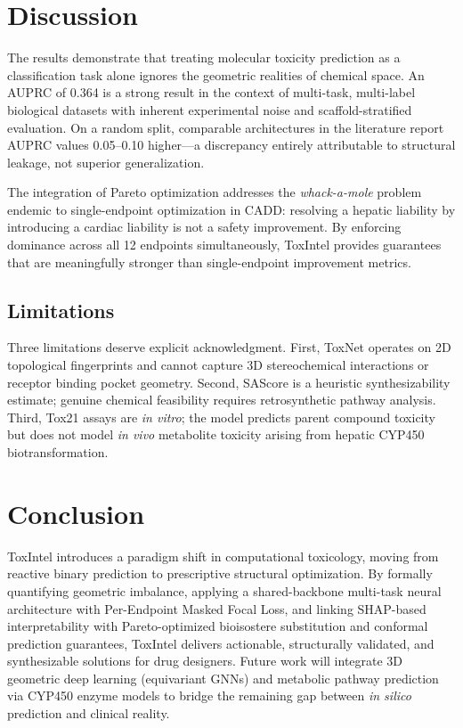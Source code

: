 \documentclass[lettersize,journal]{IEEEtran}
\begin{document}
\section{Discussion}
The results demonstrate that treating molecular toxicity prediction as a
classification task alone ignores the geometric realities of chemical space.
An AUPRC of 0.364 is a strong result in the context of multi-task,
multi-label biological datasets with inherent experimental noise and
scaffold-stratified evaluation.
On a random split, comparable architectures in the literature report AUPRC
values 0.05--0.10 higher---a discrepancy entirely attributable to structural
leakage, not superior generalization.

The integration of Pareto optimization addresses the \textit{whack-a-mole}
problem endemic to single-endpoint optimization in CADD: resolving a hepatic
liability by introducing a cardiac liability is not a safety improvement.
By enforcing dominance across all 12 endpoints simultaneously, ToxIntel
provides guarantees that are meaningfully stronger than single-endpoint
improvement metrics.

\subsection{Limitations}
Three limitations deserve explicit acknowledgment.
First, ToxNet operates on 2D topological fingerprints and cannot capture
3D stereochemical interactions or receptor binding pocket geometry.
Second, SAScore is a heuristic synthesizability estimate; genuine chemical
feasibility requires retrosynthetic pathway analysis.
Third, Tox21 assays are \textit{in vitro}; the model predicts parent
compound toxicity but does not model \textit{in vivo} metabolite toxicity
arising from hepatic CYP450 biotransformation.

\section{Conclusion}
ToxIntel introduces a paradigm shift in computational toxicology, moving
from reactive binary prediction to prescriptive structural optimization.
By formally quantifying geometric imbalance, applying a shared-backbone
multi-task neural architecture with Per-Endpoint Masked Focal Loss, and
linking SHAP-based interpretability with Pareto-optimized bioisostere
substitution and conformal prediction guarantees, ToxIntel delivers
actionable, structurally validated, and synthesizable solutions for drug
designers.
Future work will integrate 3D geometric deep learning (equivariant GNNs)
and metabolic pathway prediction via CYP450 enzyme models to bridge the
remaining gap between \textit{in silico} prediction and clinical reality.
\end{document}
